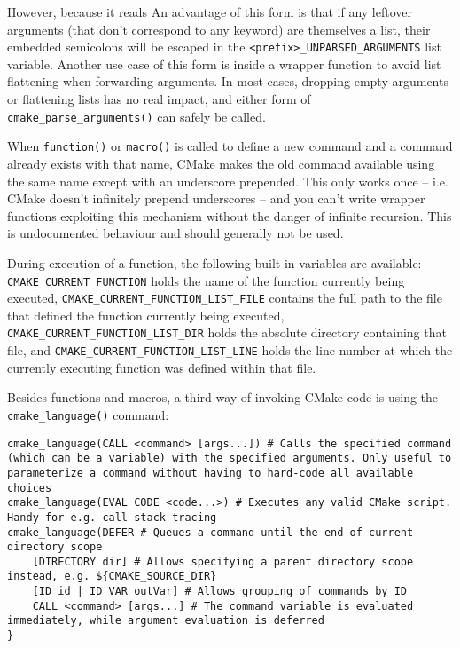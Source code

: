 \documentclass[8pt, table, xcdraw]{article}%
\begin{document}
However, because it reads %
An advantage of this form is that if any leftover arguments (that don't correspond to any keyword) are themselves a list, their embedded semicolons will be escaped in the \lstinline{<prefix>_UNPARSED_ARGUMENTS} list variable. Another use case of this form is inside a wrapper function to avoid list flattening when forwarding arguments. In most cases, dropping empty arguments or flattening lists has no real impact, and either form of \lstinline{cmake_parse_arguments()} can safely be called.

When \lstinline{function()} or \lstinline{macro()} is called to define a new command and a command already exists with that name, CMake makes the old command available using the same name except with an underscore prepended. This only works once -- i.e. CMake doesn't infinitely prepend underscores -- and you can't write wrapper functions exploiting this mechanism without the danger of infinite recursion. This is undocumented behaviour and should generally not be used.

During execution of a function, the following built-in variables are available: \lstinline{CMAKE_CURRENT_FUNCTION} holds the name of the function currently being executed, \lstinline{CMAKE_CURRENT_FUNCTION_LIST_FILE} contains the full path to the file that defined the function currently being executed, \lstinline{CMAKE_CURRENT_FUNCTION_LIST_DIR} holds the absolute directory containing that file, and \lstinline{CMAKE_CURRENT_FUNCTION_LIST_LINE} holds the line number at which the currently executing function was defined within that file.

Besides functions and macros, a third way of invoking CMake code is using the \lstinline{cmake_language()} command:

\begin{lstlisting}
cmake_language(CALL <command> [args...]) # Calls the specified command (which can be a variable) with the specified arguments. Only useful to parameterize a command without having to hard-code all available choices
cmake_language(EVAL CODE <code...>) # Executes any valid CMake script. Handy for e.g. call stack tracing
cmake_language(DEFER # Queues a command until the end of current directory scope
    [DIRECTORY dir] # Allows specifying a parent directory scope instead, e.g. ${CMAKE_SOURCE_DIR}
    [ID id | ID_VAR outVar] # Allows grouping of commands by ID
    CALL <command> [args...] # The command variable is evaluated immediately, while argument evaluation is deferred
}
\end{lstlisting}
\end{document}
